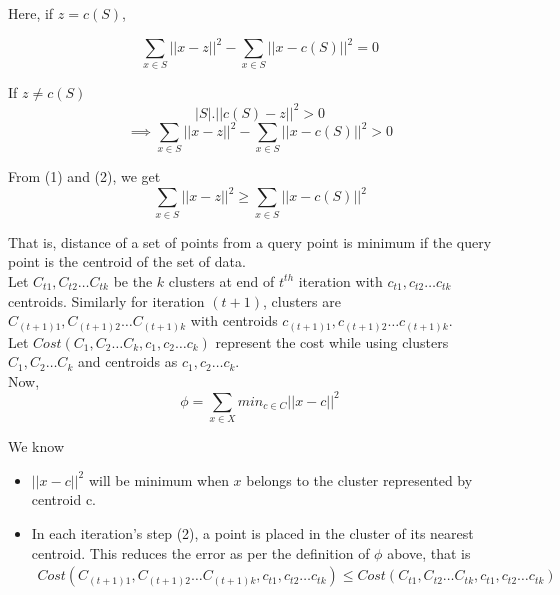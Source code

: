 \documentclass[11pt]{article}
\begin{document}
{Here, if $z = c(S)$, 

\setcounter{equation}{0}
\begin{equation}\label{eq:simple}
\sum_{x \in S} || x - z ||^2 - \sum_{x \in S} || x - c(S)||^2 = 0
\end{equation}

If $z \neq c(S)$
$$|S| . || c(S) - z ||^2 > 0$$
\begin{equation}\label{eq:simple}
\implies \sum_{x \in S} || x - z ||^2 - \sum_{x \in S} || x - c(S)||^2 > 0
\end{equation}

From (1) and (2), we get
\begin{equation}\label{eq:simple}
\sum_{x \in S} || x - z ||^2 \geq \sum_{x \in S} || x - c(S)||^2 
\end{equation}

That is, distance of a set of points from a query point is minimum if the query point is the centroid of the set of data.\\

Let $C_{t1}, C_{t2} \hdots C_{tk}$ be the $k$ clusters at end of $t^{th}$ iteration with $c_{t1}, c_{t2} \hdots c_{tk}$ centroids. Similarly for iteration $(t+1)$, clusters are $C_{(t+1)1}, C_{(t+1)2} \hdots C_{(t+1)k}$ with centroids $c_{(t+1)1}, c_{(t+1)2} \hdots c_{(t+1)k}$. \\

Let $Cost (C_1, C_2 \hdots C_k, c_1, c_2 \hdots c_k)$ represent the cost while using clusters $C_1, C_2 \hdots C_k$ and centroids as $c_1, c_2 \hdots c_k$.\\

Now, $$\phi = \sum_{x \in X} min_{c \in C} ||x-c||^2$$

We know 
\begin{itemize}
\item $||x-c||^2$ will be minimum when $x$ belongs to the cluster represented by centroid c.
\item In each iteration's step (2), a point is placed in the cluster of its nearest centroid. This reduces the error as per the definition of $\phi$ above, that is
\begin{equation}\label{eq:simple}
\begin{aligned}
Cost (C_{(t+1)1}, C_{(t+1)2} \hdots C_{(t+1)k}, c_{t1}, c_{t2} \hdots c_{tk}) \leq Cost (C_{t1}, C_{t2} \hdots C_{tk}, c_{t1}, c_{t2} \hdots c_{tk})
\end{aligned}
\end{equation}


\end{itemize}}
\end{document}
